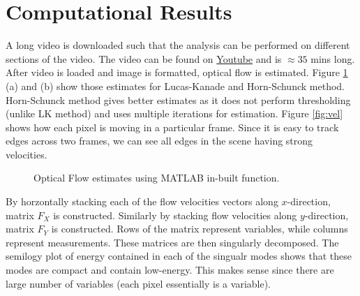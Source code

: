 \documentclass{article}
\begin{document}
\section{Computational Results}\label{Result}
A long video is downloaded such that the analysis can be performed on different sections of the video. The video can be found on \href{https://www.youtube.com/watch?v=hNuVhnMWYhA}{Youtube} and is $\approx 35$ mins long. After video is loaded and image is formatted, optical flow is estimated. Figure \ref{fig:flow} (a) and (b) show those estimates for Lucas-Kanade and Horn-Schunck method. Horn-Schunck method gives better estimates as it does not perform thresholding (unlike LK method) and uses multiple iterations for estimation. Figure \ref{fig:vel} shows how each pixel is moving in a particular frame. Since it is easy to track edges across two frames, we can see all edges in the scene having strong velocities.

\begin{figure}[!t]
\centering
{}
\hspace{5mm} %
\caption{Optical Flow estimates using MATLAB in-built function.}
\label{fig:flow}
\end{figure}

By horzontally stacking each of the flow velocities vectors along $x$-direction, matrix $F_X$ is constructed. Similarly by stacking flow velocities along $y$-direction, matrix $F_Y$ is constructed. Rows of the matrix represent variables, while columns represent measurements. These matrices are then singularly decomposed. The semilogy plot of energy contained in each of the singualr modes shows that these modes are compact and contain low-energy. This makes sense since there are large number of variables (each pixel essentially is a variable).
\end{document}
